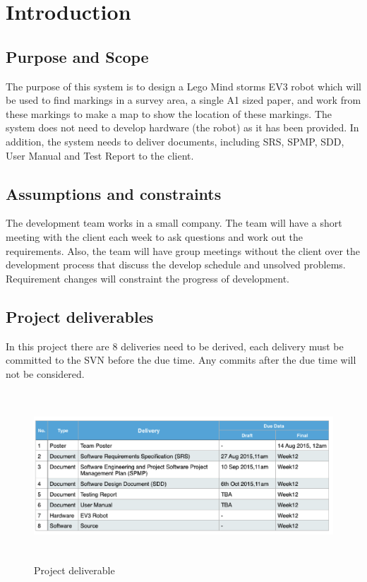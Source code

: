 \documentclass[11pt, a4paper]{article}
\begin{document}
\newpage


\setcounter{page}{1}

\section{Introduction}
\subsection{Purpose and Scope}
The purpose of this system is to design a Lego Mind storms EV3 robot which will be used to find markings in a survey area, a single A1 sized paper, and work from these markings to make a map to show the location of these markings. The system does not need to develop hardware (the robot) as it has been provided. In addition, the system needs to deliver documents, including SRS, SPMP, SDD, User Manual and Test Report to the client.

\subsection{Assumptions and constraints}
The development team works in a small company. The team will have a short meeting with the client each week to ask questions and work out the requirements. Also, the team will have group meetings without the client over the development process that discuss the develop schedule and unsolved problems. Requirement changes will constraint the progress of development.

\subsection{Project deliverables}
In this project there are 8 deliveries need to be derived, each delivery must be committed to the SVN before the due time. Any commits after the due time will not be considered. 

\begin{figure}[H]
\centering
\includegraphics[height=2.5in]{PD.png}
\caption[Project deliverable]{Project deliverable}
\end{figure}
\end{document}
